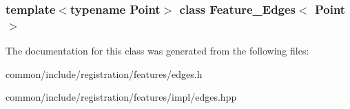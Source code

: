 \subsubsection*{template$<$typename Point$>$ class Feature\_\-Edges$<$ Point $>$}



The documentation for this class was generated from the following files:\begin{DoxyCompactItemize}
\item 
common/include/registration/features/edges.h\item 
common/include/registration/features/impl/edges.hpp\end{DoxyCompactItemize}
